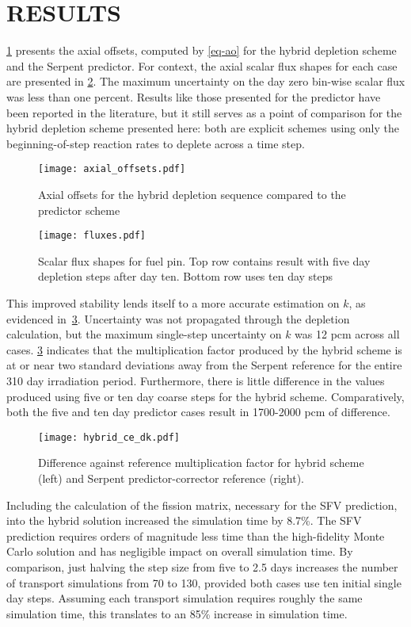 \documentclass[letterpaper]{mc2021}
\begin{document}
\section{RESULTS}

\cref{fig-ao} presents the axial offsets, computed by \cref{eq-ao} for the hybrid
depletion scheme and the Serpent predictor.
For context, the axial scalar flux shapes for each case are presented in \cref{fig-fluxes}.
The maximum uncertainty on the day zero bin-wise scalar flux was less than one percent.
Results like those presented for the predictor have been reported in the literature,
but it still serves as a point of comparison for the hybrid depletion scheme presented here:
both are explicit schemes using only the beginning-of-step reaction rates to deplete across
a time step.

\begin{figure}
    \texttt{[image: axial\_offsets.pdf]}
    \caption{Axial offsets for the hybrid depletion sequence compared to the predictor scheme}
    \label{fig-ao}
\end{figure}

\begin{figure}
    \texttt{[image: fluxes.pdf]}
    \caption{Scalar flux shapes for fuel pin. Top row contains result with five
    day depletion steps after day ten. Bottom row uses ten day steps}
    \label{fig-fluxes}
\end{figure}

This improved stability lends itself to a more accurate estimation on $k$, as evidenced
in~\cref{fig-dk}.
Uncertainty was not propagated through the depletion calculation, but the maximum single-step
uncertainty on $k$ was 12 pcm across all cases.
\cref{fig-dk} indicates that the multiplication factor produced by the hybrid scheme is
at or near two standard deviations away from the Serpent reference for the entire
310 day irradiation period.
Furthermore, there is little difference in the values produced using five or ten day
coarse steps for the hybrid scheme.
Comparatively, both the five and ten day predictor cases result in 1700-2000 pcm
of difference.

\begin{figure}
    \texttt{[image: hybrid\_ce\_dk.pdf]}
    \caption{Difference against reference multiplication factor for hybrid scheme (left)
    and Serpent predictor-corrector reference (right).}
    \label{fig-dk}
\end{figure}

Including the calculation of the fission matrix, necessary for the SFV prediction, into
the hybrid solution increased the simulation time by 8.7\%.
The SFV prediction requires orders of magnitude less time than the high-fidelity Monte
Carlo solution and has negligible impact on overall simulation time.
By comparison, just halving the step size from five to 2.5 days increases the number of
transport simulations from 70 to 130, provided both cases use ten initial single day steps.
Assuming each transport simulation requires roughly the same simulation time, this translates
to an 85\% increase in simulation time.
\end{document}
